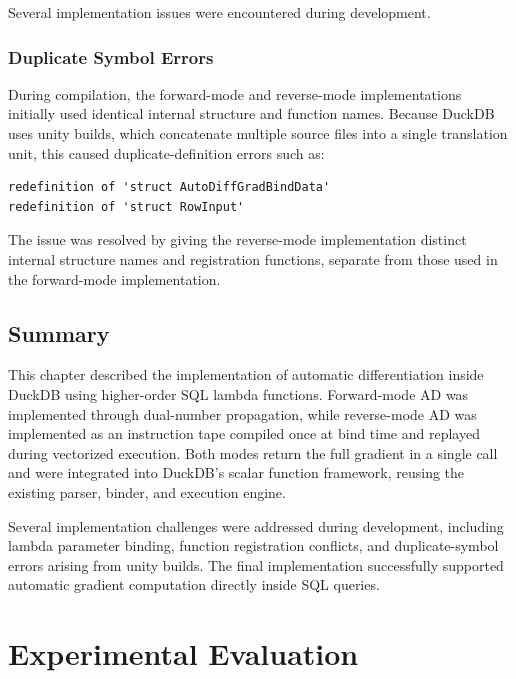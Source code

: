 \documentclass[12pt]{report}
\begin{document}
Several implementation issues were encountered during development.

\subsection{Duplicate Symbol Errors}

During compilation, the forward-mode and reverse-mode implementations initially used identical internal structure and function names. Because DuckDB uses unity builds, which concatenate multiple source files into a single translation unit, this caused duplicate-definition errors such as:

\begin{lstlisting}
redefinition of 'struct AutoDiffGradBindData'
redefinition of 'struct RowInput'
\end{lstlisting}

The issue was resolved by giving the reverse-mode implementation distinct internal structure names and registration functions, separate from those used in the forward-mode implementation.

\section{Summary}

This chapter described the implementation of automatic differentiation inside DuckDB using higher-order SQL lambda functions. Forward-mode AD was implemented through dual-number propagation, while reverse-mode AD was implemented as an instruction tape compiled once at bind time and replayed during vectorized execution. Both modes return the full gradient in a single call and were integrated into DuckDB's scalar function framework, reusing the existing parser, binder, and execution engine.

Several implementation challenges were addressed during development, including lambda parameter binding, function registration conflicts, and duplicate-symbol errors arising from unity builds. The final implementation successfully supported automatic gradient computation directly inside SQL queries.


\chapter{Experimental Evaluation}
\label{ch:evaluation}
\end{document}

